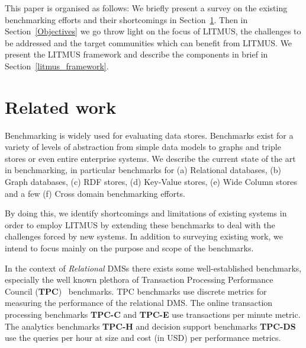 \documentclass{llncs}
\begin{document}
        This paper is organised as follows: We briefly present a survey on the existing benchmarking efforts and their shortcomings in Section~\ref{relwork}. Then in Section~\ref{Objectives} we go throw light on the focus of LITMUS, the challenges to be addressed and the target communities which can benefit from LITMUS. We present the LITMUS framework and describe the components in brief in Section~\ref{litmus_framework}.  




\section{Related work}\label{relwork}

    Benchmarking is widely used for evaluating data stores. Benchmarks exist for a variety of levels of abstraction from simple data models to graphs and triple stores or even entire enterprise systems.
    We describe the current state of the art in benchmarking, in particular benchmarks for (a) Relational databases, (b) Graph databases, (c) RDF stores, (d) Key-Value stores, (e) Wide Column stores and a few (f) Cross domain benchmarking efforts.
    
    By doing this, we identify shortcomings and limitations of existing systems in order to employ LITMUS by extending these benchmarks to deal with the challenges forced by new systems.
    In addition to surveying existing work, we intend to focus mainly on the purpose and scope of the benchmarks.
    
    In the context of \textit{Relational} DMSs there exists some well-established benchmarks, especially the well known plethora of Transaction Processing Performance Council (\textbf{TPC})~\cite{Nambiar2011} benchmarks.
    TPC benchmarks use discrete metrics for measuring the performance of the relational DMS. The online transaction processing benchmarks \textbf{TPC-C} and \textbf{TPC-E} use transactions per minute metric. The analytics benchmarks \textbf{TPC-H} and decision support benchmarks \textbf{TPC-DS} use the queries per hour at size and cost (in USD) per performance metrics.
    
\end{document}
